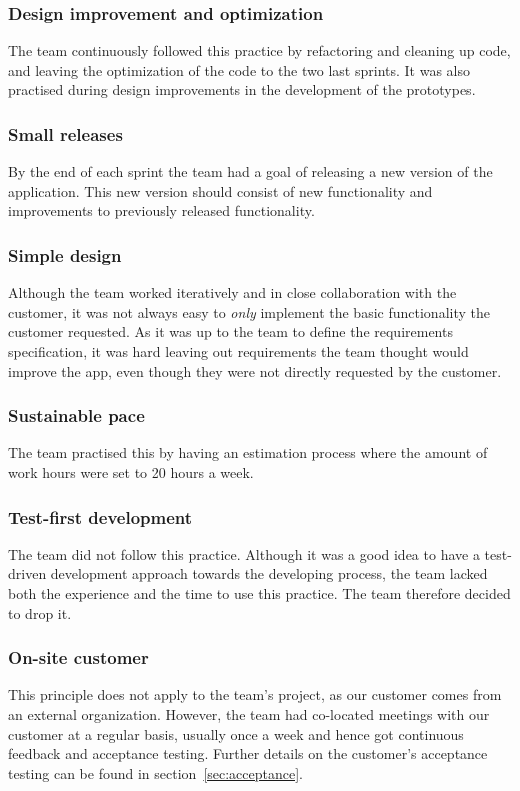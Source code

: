 \subsubsection{Design improvement and optimization}
The team continuously followed this practice by refactoring and cleaning up code, and leaving the optimization of the code to the two last sprints. It was also practised during design improvements in the development of the prototypes.
 
\subsubsection{Small releases}
By the end of each sprint the team had a goal of releasing a new version of the application. This new version should consist of new functionality and improvements to previously released functionality.

\subsubsection{Simple design}
Although the team worked iteratively and in close collaboration with the customer, it was not always easy to \emph{only} implement the basic functionality the customer requested. As it was up to the team to define the requirements specification, it was hard leaving out requirements the team thought would improve the app, even though they were not directly requested by the customer.

\subsubsection{Sustainable pace}
The team practised this by having an estimation process where the amount of work hours were set to 20 hours a week.

\subsubsection{Test-first development}
The team did not follow this practice. Although it was a good idea to have a test-driven development approach towards the developing process, the team lacked both the experience and the time to use this practice. The team therefore decided to drop it.

\subsubsection{On-site customer}
This principle does not apply to the team's project, as our customer comes from an external organization. However, the team had co-located meetings with our customer at a regular basis, usually once a week and hence got continuous feedback and acceptance testing. Further details on the customer's acceptance testing can be found in section~\ref{sec:acceptance}.
